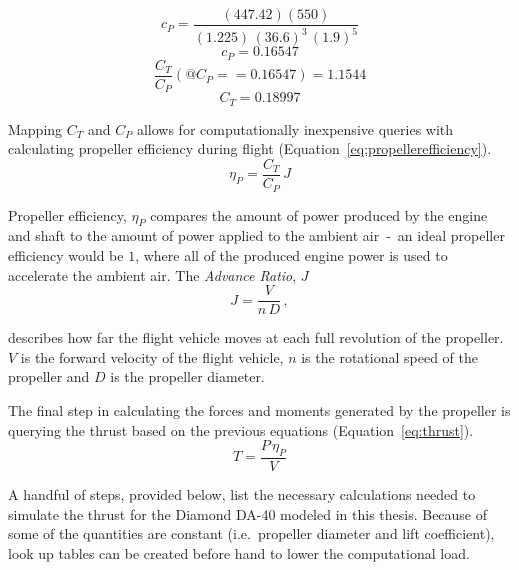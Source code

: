 \documentclass[12pt]{report}
\begin{document}
\begin{equation}\label{eq:calcCT1}
  c_P = \frac{(447.42)(550)}{{(1.225)} \, {(36.6)}^3 \, {(1.9)}^5}
\end{equation}
\begin{equation}\label{eq:calcCT2}
  c_P = 0.16547
\end{equation}
\begin{equation}\label{eq:calcCT3}
  \frac{C_T}{C_P}(@C_P == 0.16547) = 1.1544
\end{equation}
\begin{equation}\label{eq:calcCT4}
  C_T = 0.18997
\end{equation}


Mapping \(C_T\) and \(C_P\) allows for computationally inexpensive queries with calculating propeller efficiency during flight (Equation~\ref{eq:propellerefficiency}).
\begin{equation}\label{eq:propellerefficiency}
  \eta_P = \frac{C_T}{C_P} \, J
\end{equation}

Propeller efficiency, \( \eta_P \) compares the amount of power produced by the engine and shaft to the amount of power applied to the ambient air~-~an ideal propeller efficiency would be \(1\), where all of the produced engine power is used to accelerate the ambient air. The \textit{Advance Ratio}, \(J\)
\begin{equation}\label{eq:advanceRatio}
  J = \frac{V}{n \, D} \, ,
\end{equation}

describes how far the flight vehicle moves at each full revolution of the propeller.
\(V\) is the forward velocity of the flight vehicle, \(n\) is the rotational speed of the propeller and \(D\) is the propeller diameter.

The final step in calculating the forces and moments generated by the propeller is querying the thrust based on the previous equations (Equation~\ref{eq:thrust}).
\begin{equation}\label{eq:thrust}
  T = \frac{P \, \eta_P}{V}
\end{equation}

A handful of steps, provided below, list the necessary calculations needed to simulate the thrust for the Diamond DA-40 modeled in this thesis. Because of some of the quantities are constant (i.e.\ propeller diameter and lift coefficient), look up tables can be created before hand to lower the computational load.
\end{document}

